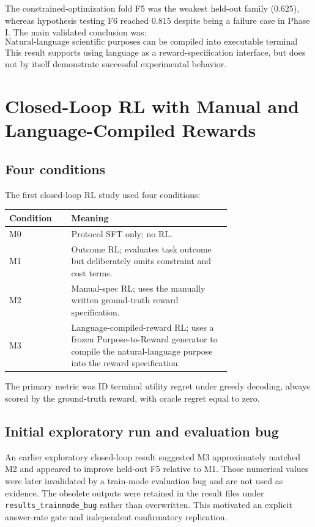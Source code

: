 \documentclass[11pt]{article}
\begin{document}
The constrained-optimization fold F5 was the weakest held-out family ($0.625$), whereas hypothesis testing F6 reached $0.815$ despite being a failure case in Phase I. The main validated conclusion was:
\[
\boxed{
\text{Natural-language scientific purposes can be compiled into executable terminal rewards with strong held-out generalization.}
}
\]
This result supports using language as a reward-specification interface, but does not by itself demonstrate successful experimental behavior.

\section{Closed-Loop RL with Manual and Language-Compiled Rewards}
\subsection{Four conditions}
The first closed-loop RL study used four conditions:
\begin{center}
\begin{tabular}{lp{0.72\linewidth}}
\toprule
Condition & Meaning\\
\midrule
M0 & Protocol SFT only; no RL.\\
M1 & Outcome RL; evaluates task outcome but deliberately omits constraint and cost terms.\\
M2 & Manual-spec RL; uses the manually written ground-truth reward specification.\\
M3 & Language-compiled-reward RL; uses a frozen Purpose-to-Reward generator to compile the natural-language purpose into the reward specification.\\
\bottomrule
\end{tabular}
\end{center}
The primary metric was ID terminal utility regret under greedy decoding, always scored by the ground-truth reward, with oracle regret equal to zero.

\subsection{Initial exploratory run and evaluation bug}
An earlier exploratory closed-loop result suggested M3 approximately matched M2 and appeared to improve held-out F5 relative to M1. Those numerical values were later invalidated by a train-mode evaluation bug and are not used as evidence. The obsolete outputs were retained in the result files under \texttt{results\_trainmode\_bug} rather than overwritten. This motivated an explicit answer-rate gate and independent confirmatory replication.
\end{document}
